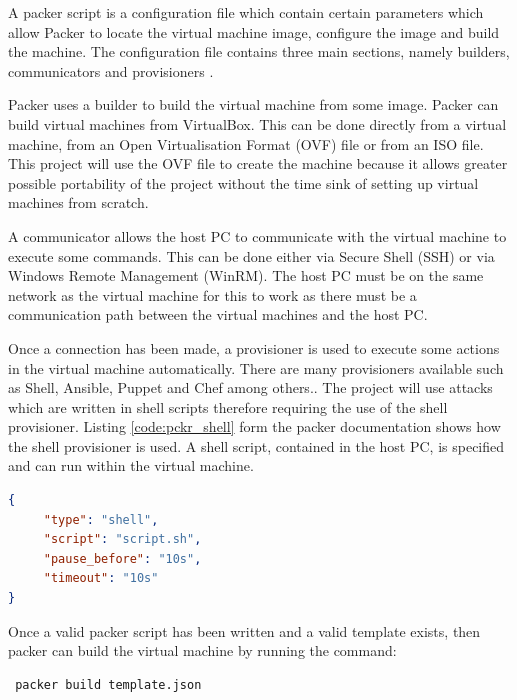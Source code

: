 A packer script is a configuration file which contain certain parameters which allow Packer to locate the virtual machine image, configure the image and build the machine. The configuration file contains three main sections, namely builders, communicators and provisioners \cite{pckr_doc}.

Packer uses a builder to build the virtual machine from some image. Packer can build virtual machines from VirtualBox\cite{pckr_doc}. This can be done directly from a virtual machine, from an Open Virtualisation Format (OVF) file or from an ISO file. This project will use the OVF file to create the machine because it allows greater possible portability of the project without the time sink of setting up virtual machines from scratch.

A communicator allows the host PC to communicate with the virtual machine to execute some commands. This can be done either via Secure Shell (SSH) or via Windows Remote Management (WinRM).\cite{pckr_doc} The host PC must be on the same network as the virtual machine for this to work as there must be a communication path between the virtual machines and the host PC.

Once a connection has been made, a provisioner is used to execute some actions in the virtual machine automatically. There are many provisioners available such as Shell, Ansible, Puppet and Chef among others.\cite{pckr_doc}. The project will use attacks which are written in shell scripts therefore requiring the use of the shell provisioner. Listing \ref{code:pckr_shell} form the packer documentation shows how the shell provisioner is used. A shell script, contained in the host PC, is specified and can run within the virtual machine.
\begin{lstlisting}[language = json, caption = Packer Shell Example, label=code:pckr_shell]
{
     "type": "shell",
     "script": "script.sh",
     "pause_before": "10s",
     "timeout": "10s"
}
\end{lstlisting}
Once a valid packer script has been written and a valid template exists, then packer can build the virtual machine by running the command:
\begin{verbatim}
 packer build template.json
\end{verbatim}
